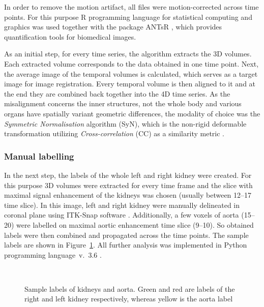 In order to remove 	the motion artifact, all files were motion-corrected across time points. For this purpose R programming language for statistical computing and graphics was used \cite{R} together with the package ANTsR \cite{ANTsR}, which provides quantification tools for biomedical images. 

As an initial step, for every time series, the algorithm extracts the 3D volumes. Each extracted volume corresponds to the data obtained in one time point. Next, the average image of the temporal volumes is calculated, which serves as a target image for image registration. Every temporal volume is then aligned to it and at the end they are combined back together into the 4D time series.
As the misalignment concerns the inner structures, not the whole body and various organs have spatially variant geometric differences, the modality of choice was the  \textit{Symmetric Normalisation} algorithm (SyN), which is the non-rigid deformable transformation utilizing \textit{Cross-correlation} (CC) as a similarity metric \cite{avants2011reproducible, avants2008symmetric, el2016current}. 

\subsubsection{Manual labelling}
In the next step, the labels of the whole left and right kidney were created. For this purpose 3D volumes were extracted for every time frame and the slice with maximal signal enhancement of the kidneys was chosen (usually between 12--17 time slice). In this image, left and right kidney were manually delineated in coronal plane using ITK-Snap software \cite{itk-snap}. Additionally, a few voxels of aorta (15--20) were labelled on maximal aortic enhancement time slice (9--10). So obtained labels were then combined and propagated across the time points. The sample labels are shown in Figure~\ref{fig:labels}.
All further analysis was implemented in Python programming language~v.~3.6 \cite{python}.

\begin{figure}
\captionsetup[subfloat]{captionskip=0.5cm}
	\centering
	\hspace{0.02\textwidth}
	\\	
\vspace{0.5cm}
\caption[Sample labels of kidneys and aorta]{Sample labels of kidneys and aorta. Green and red are labels of the right and left kidney respectively, whereas yellow is the aorta label}
\label{fig:labels}
\end{figure}

